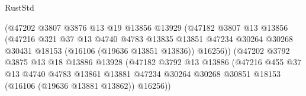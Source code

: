 \begin{lexlean}{RustStd}
\begin{coremodule}
                                      (@47202
                                        @3807
                                        @3876
                                        @13
                                        @19
                                        @13856
                                        @13929
                                        (@47182
                                          @3807
                                          @13
                                          @13856
                                          (@47216
                                            @321
                                            @37
                                            @13
                                            @4740
                                            @4783
                                            @13835
                                            @13851
                                            @47234
                                            @30264
                                            @30268
                                            @30431
                                            @18153
                                            (@16106 (@19636 @13851 @13836))
                                            @16256))
                                        (@47202
                                          @3792
                                          @3875
                                          @13
                                          @18
                                          @13886
                                          @13928
                                          (@47182
                                            @3792
                                            @13
                                            @13886
                                            (@47216
                                              @455
                                              @37
                                              @13
                                              @4740
                                              @4783
                                              @13861
                                              @13881
                                              @47234
                                              @30264
                                              @30268
                                              @30851
                                              @18153
                                              (@16106 (@19636 @13881 @13862))
                                              @16256))

\end{coremodule}
\end{lexlean}
